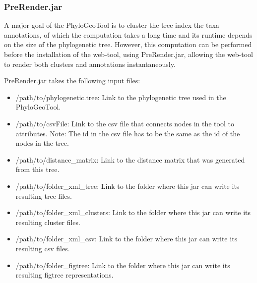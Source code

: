 \documentclass[a4paper, 11pt]{article} %
\begin{document}
\subsubsection{PreRender.jar}
A major goal of the PhyloGeoTool is to cluster the tree index the taxa annotations, of which the computation takes a long time and its runtime depends on the size of the phylogenetic tree. 
However, this computation can be performed before the installation of the web-tool, using PreRender.jar, allowing the web-tool to render both clusters and annotations instantaneously.

PreRender.jar takes the following input files: 
\begin{itemize}
\item /path/to/phylogenetic.tree: Link to the phylogenetic tree used in the PhyloGeoTool.
\item /path/to/csvFile: Link to the csv file that connects nodes in the tool to attributes. Note: The id in the csv file has to be the same as the id of the nodes in the tree.
\item /path/to/distance\_matrix: Link to the distance matrix that was generated from this tree. %
\item /path/to/folder\_xml\_tree: Link to the folder where this jar can write its resulting tree files.
\item /path/to/folder\_xml\_clusters: Link to the folder where this jar can write its resulting cluster files.
\item /path/to/folder\_xml\_csv: Link to the folder where this jar can write its resulting csv files.
\item /path/to/folder\_figtree: Link to the folder where this jar can write its resulting figtree representations.
\end{itemize}
\end{document}
